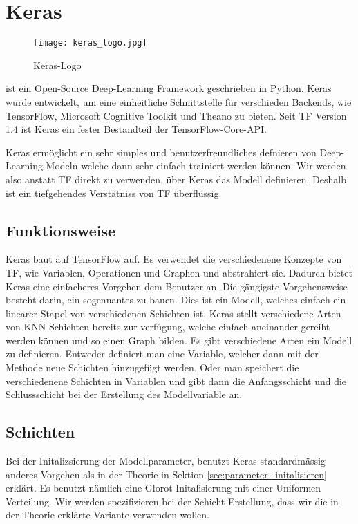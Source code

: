 \pagebreak
\section{Keras}
\begin{wrapfigure}{l}{3cm}
  \texttt{[image: keras\_logo.jpg]}
  \caption{Keras-Logo}
\end{wrapfigure}
 ist ein Open-Source Deep-Learning Framework geschrieben in
Python. Keras wurde entwickelt, um eine einheitliche Schnittstelle für
verschieden Backends, wie TensorFlow, Microsoft Cognitive Toolkit und Theano zu
bieten. Seit TF Version 1.4 ist Keras ein fester Bestandteil der TensorFlow-Core-API.

Keras ermöglicht ein sehr simples und benutzerfreundliches defnieren von
Deep-Learning-Modeln welche dann sehr einfach trainiert werden können.
Wir werden also anstatt TF direkt zu verwenden, über Keras das Modell definieren.
Deshalb ist ein tiefgehendes Verstätniss von TF überflüssig.

\subsection{Funktionsweise}
Keras baut auf TensorFlow auf. Es verwendet die verschiedenene Konzepte von TF,
wie Variablen, Operationen und Graphen und abstrahiert sie.
Dadurch bietet Keras eine einfacheres Vorgehen dem Benutzer an.
\para{}
Die gängigste Vorgehensweise besteht darin, ein sogennantes
 zu bauen.
Dies ist ein Modell, welches einfach ein linearer Stapel von verschiedenen
Schichten ist. Keras stellt verschiedene Arten von KNN-Schichten bereits zur
verfügung, welche einfach aneinander gereiht werden können und so einen Graph bilden.
\para{}
Es gibt verschiedene Arten ein Modell zu definieren. Entweder definiert man eine
 Variable, welcher dann mit der Methode 
neue Schichten hinzugefügt werden.
Oder man speichert die verschiedenene Schichten in Variablen und gibt dann die
Anfangsschicht und die Schlussschicht bei der Erstellung des Modellvariable an.

\subsection{Schichten}
Bei der Initalizsierung der Modellparameter, benutzt Keras standardmässig
anderes Vorgehen als in der Theorie in Sektion \ref{sec:parameter_initalisieren} erklärt. Es benutzt nämlich eine
Glorot-Initalisierung mit einer Uniformen Verteilung. Wir werden spezifizieren
bei der Schicht-Erstellung, dass wir die in der Theorie erklärte Variante
verwenden wollen.

